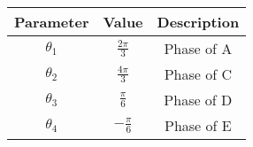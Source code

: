
\begin{center}
\begin{tabular}{|c|c|c|}
\hline
	\textbf{Parameter}& \textbf{Value}& \textbf{Description}\\ \hline
	$\theta_1$	&$\frac{2\pi}{3}$	&Phase of A\\ \hline
	$\theta_2$	&$\frac{4\pi}{3}$	&Phase of C\\ \hline
	$\theta_3$	&$\frac{\pi}{6}$        &Phase of D\\ \hline
	$\theta_4$	&$-\frac{\pi}{6}$       &Phase of E\\ \hline
\end{tabular}
\end{center}
